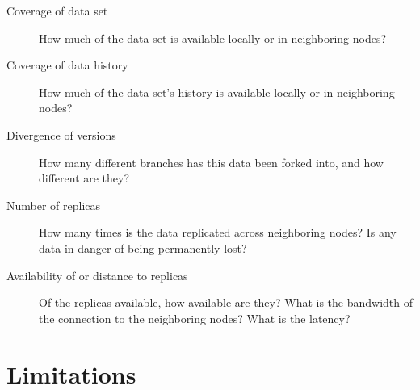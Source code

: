 \begin{description}

  \item[Coverage of data set] How much of the data set is available locally or
    in neighboring nodes?

  \item[Coverage of data history] How much of the data set's history is
    available locally or in neighboring nodes?

  \item[Divergence of versions] How many different branches has this data been
    forked into, and how different are they?

  \item[Number of replicas] How many times is the data replicated across
    neighboring nodes? Is any data in danger of being permanently lost?

  \item[Availability of or distance to replicas] Of the replicas available, how
    available are they? What is the bandwidth of the connection to the
    neighboring nodes? What is the latency?

\end{description}


\section{Limitations}


